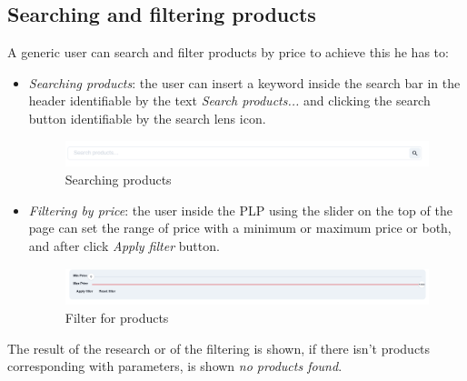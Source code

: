 \subsection{Searching and filtering products}
A generic user can search and filter products by price to achieve this he has to:
\begin{itemize}
    \item  \textit{Searching products}: the user can insert a keyword inside the search bar in the header identifiable by the text \textit{Search products...} and clicking the search button identifiable by the search lens icon.
          \begin{figure}[!ht]
              \caption{Searching products}
              \vspace{10px}
              \includegraphics[scale=0.2]{../../../../Images/userManual/searcbar.png}
              \centering
          \end{figure}
    \item \textit{Filtering by price}: the user inside the PLP using the slider on the top of the page can set the range of price with a minimum or maximum price or both, and after click \textit{Apply filter} button.
          \begin{figure}[!ht]
              \caption{Filter for products}
              \vspace{10px}
              \includegraphics[scale=0.2]{../../../../Images/userManual/filter.png}
              \centering
          \end{figure}
\end{itemize}
The result of the research or of the filtering is shown, if there isn't products corresponding with parameters, is shown \textit{no products found}.
\newpage
